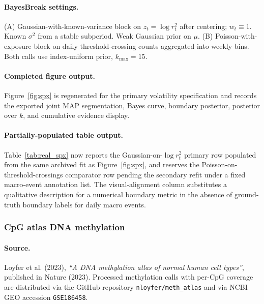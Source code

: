 \paragraph{BayesBreak settings.}
(A) Gaussian-with-known-variance block on $z_t=\log r_t^2$ after centering; $w_t\equiv 1$. Known
$\sigma^2$ from a stable subperiod. Weak Gaussian prior on $\mu$. (B) Poisson-with-exposure
block on daily threshold-crossing counts aggregated into weekly bins. Both calls use index-uniform
prior, $k_{\max}=15$.

\paragraph{Completed figure output.}
Figure~\ref{fig:spx} is regenerated for the primary volatility specification and records the exported joint MAP segmentation, Bayes curve, boundary posterior, posterior over $k$, and cumulative evidence display.

\paragraph{Partially-populated table output.}
Table~\ref{tab:real_spx} now reports the Gaussian-on-$\log r_t^2$ primary row populated from the same archived fit as Figure~\ref{fig:spx}, and reserves the Poisson-on-threshold-crossings comparator row pending the secondary refit under a fixed macro-event annotation list. The visual-alignment column substitutes a qualitative description for a numerical boundary metric in the absence of ground-truth boundary labels for daily macro events.

\subsubsection{CpG atlas DNA methylation}
\label{app:real-data-methylation}

\paragraph{Source.}
Loyfer et al. (2023), \emph{``A DNA methylation atlas of normal human cell types''}, published in
Nature (2023). Processed methylation calls with per-CpG coverage are distributed via the GitHub
repository \texttt{nloyfer/meth\_atlas} and via NCBI GEO accession \texttt{GSE186458}.

